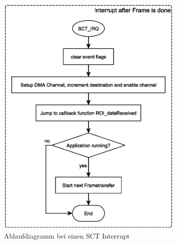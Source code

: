 \begin{figure}[h!]
\begin{subfigure}[t]{0.425\textwidth}
	    		\label{fig:ablaufInit}
        \end{subfigure}
        ~ %
        \begin{subfigure}[t]{0.52\textwidth}
        	 \includegraphics[width=1\textwidth, trim=0mm 0mm 0mm 0mm, clip=true]{images/software/sct_irq.eps}%
	    		\caption{Ablaufdiagramm bei einen SCT Interrupt}
	    		\label{fig:Ablaufsct_interrupt}
        \end{subfigure}
        ~
        \begin{subfigure}[b]{0.65\textwidth}

\end{subfigure}
\end{figure}

